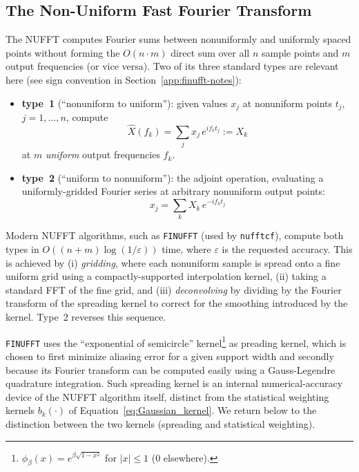 \documentclass[twocolumn,10pt]{article}
\newcommand{\nufftcf}{\texttt{nufftcf}\xspace}
\begin{document}
\subsection{The Non-Uniform Fast Fourier Transform}
\label{sec:nufft}
%
The NUFFT computes Fourier sums between nonuniformly and uniformly
spaced points without forming the $O(n\cdot m)$ direct sum over all $n$
sample points and $m$ output frequencies (or vice versa). Two of its
three standard types are relevant here (see sign convention in Section~\ref{app:finufft-notes}):
\begin{itemize}
    \item \textbf{type~1} (``nonuniform to uniform''): given values $x_j$
    at nonuniform points $t_j$, $j=1,\dots,n$, compute
    \begin{equation}
    \hat X(f_k) = \sum_j x_j\, e^{i f_k t_j} := X_k
    \label{eq:nufft_type1}
    \end{equation}
     at $m$ \textit{uniform} output frequencies $f_k$.
    \item \textbf{type~2} (``uniform to nonuniform''): the adjoint
    operation, evaluating a uniformly-gridded Fourier series at
    arbitrary nonuniform output points:
        \begin{equation}
    	x_j = \sum_k X_k\, e^{-i f_k t_j}
    	\label{eq:nufft_type2}
    \end{equation}
    
\end{itemize}

Modern NUFFT algorithms, such as \texttt{FINUFFT} \citep{barnett2019finufft}
(used by \nufftcf), compute both types in $O((n+m)\log(1/\varepsilon))$ time,
where $\varepsilon$ is the requested accuracy. This is achieved by (i)
\textit{gridding}, where each nonuniform sample is spread onto a fine uniform
grid using a compactly-supported interpolation kernel, (ii) taking
a standard FFT of the fine grid, and (iii) \textit{deconvolving} by dividing by
the Fourier transform of the spreading kernel to correct for the smoothing
introduced by the kernel. Type~2 reverses this sequence. 

\texttt{FINUFFT} uses the
``exponential of semicircle'' kernel\footnote{$\phi_\beta(x)=e^{\beta\sqrt{1-x^2}}$ for $|x|\leq 1$ ($0$ elsewhere).} as preading kernel, which is chosen to first minimize aliasing
error for a given support width and secondly because its Fourier transform can
be computed easily using a Gauss-Legendre quadrature integration. Such spreading kernel
is an internal numerical-accuracy device of the NUFFT
algorithm itself, distinct from the statistical weighting kernels
$b_k(\cdot)$ of Equation~\ref{eq:Gaussian_kernel}. We return below to the distinction between the two kernels (spreading and statistical weighting).
%
\end{document}
